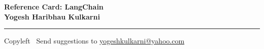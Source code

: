 
\graphicspath{{images/}}

\footnotesize


\begin{center}
\Large{\textbf{Reference Card: LangChain\\ Yogesh Haribhau Kulkarni}}  
\end{center}

\begin{multicols}{2}

% 
\end{multicols}

\rule{\linewidth}{0.25pt}
\scriptsize
Copyleft \textcopyleft\  Send suggestions to 
\href{http://www.yogeshkulkarni.com}{yogeshkulkarni@yahoo.com}


